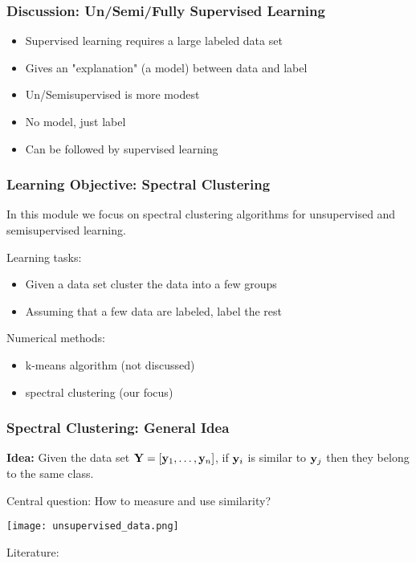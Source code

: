 \documentclass[12pt,handout]{beamer}
\begin{document}
\begin{frame}
\frametitle{Discussion: Un/Semi/Fully Supervised Learning}


\begin{itemize}
\item Supervised learning requires a large labeled data set
\item Gives an "explanation" (a model) between data and label
\item Un/Semisupervised is more modest
\item No model, just label
\item Can be followed by supervised learning
\end{itemize}


\end{frame}


\begin{frame}
\frametitle{Learning Objective: Spectral Clustering}

In this module we focus on spectral clustering algorithms for unsupervised and semisupervised learning.

\bigskip

Learning tasks:
\begin{itemize}
\item Given a data set cluster the data into a few groups
\item Assuming that a few data are labeled, label the rest
\end{itemize}

\bigskip

Numerical methods:
\begin{itemize}
	\item k-means algorithm (not discussed)
	\item spectral clustering (our focus)
\end{itemize}

\end{frame}
\begin{frame}
\frametitle{Spectral Clustering: General Idea}

{\bf Idea:}
Given the data set ${\bf Y} = [{\bf y}_1, \ldots, {\bf y}_n]$, if ${\bf y}_i$ is similar to
${\bf y}_j$ then they belong to the same class.

\bigskip

Central question: How to measure and use similarity?

\begin{center}
\texttt{[image: unsupervised\_data.png]}	
\end{center}

Literature: \cite{NgEtAl2002,PothenEtAl1990,vonLuxburg2007}
\end{frame}
\end{document}
